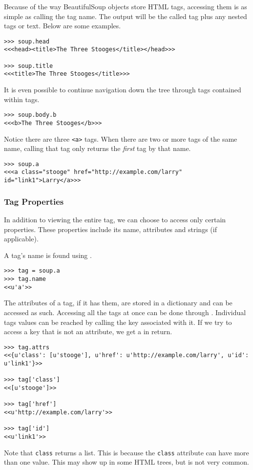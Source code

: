 Because of the way BeautifulSoup objects store HTML tags, accessing them is as simple as calling the tag name.
The output will be the called tag plus any nested tags or text.
Below are some examples.
\begin{lstlisting}
>>> soup.head
<<<head><title>The Three Stooges</title></head>>>

>>> soup.title
<<<title>The Three Stooges</title>>>
\end{lstlisting}
It is even possible to continue navigation down the tree through tags contained within tags.
\begin{lstlisting}
>>> soup.body.b
<<<b>The Three Stooges</b>>>
\end{lstlisting}
Notice there are three \lstinline{<a>} tags.
When there are two or more tags of the same name, calling that tag only returns the \textit{first} tag by that name.
\begin{lstlisting}
>>> soup.a
<<<a class="stooge" href="http://example.com/larry" id="link1">Larry</a>>>
\end{lstlisting}

\subsubsection{Tag Properties}

In addition to viewing the entire tag, we can choose to access only certain properties.
These properties include its name, attributes and strings (if applicable).

A tag's name is found using .
\begin{lstlisting}
>>> tag = soup.a
>>> tag.name
<<u'a'>>
\end{lstlisting}

The attributes of a tag, if it has them, are stored in a dictionary and can be accessed as such.
Accessing all the tags at once can be done through .
Individual tags values can be reached by calling the key associated with it.
If we try to access a key that is not an attribute, we get a  in return.
\begin{lstlisting}
>>> tag.attrs
<<{u'class': [u'stooge'], u'href': u'http://example.com/larry', u'id': u'link1'}>>

>>> tag['class']
<<[u'stooge']>>

>>> tag['href']
<<u'http://example.com/larry'>>

>>> tag['id']
<<u'link1'>>
\end{lstlisting}
Note that \lstinline{class} returns a list.
This is because the \lstinline{class} attribute can have more than one value.
This may show up in some HTML trees, but is not very common.

